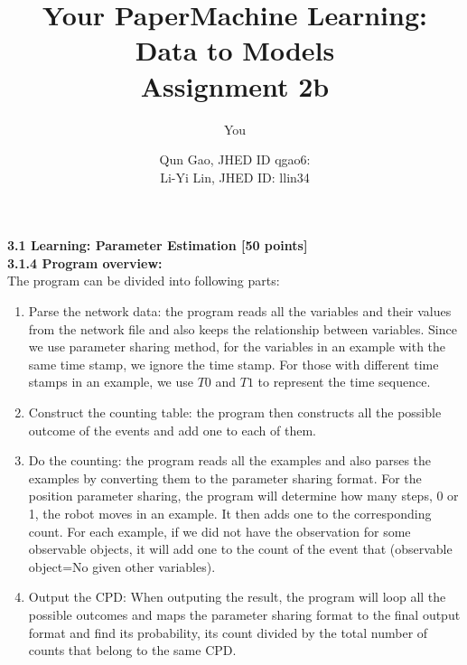 \documentclass[a4paper]{article}
\title{Your Paper}
\author{You}
\title{Machine Learning: Data to Models \\Assignment 2b}
\author{Qun Gao, JHED ID qgao6: \\Li-Yi Lin, JHED ID: llin34}
\date{}
\begin{document}
\maketitle
\noindent \Large \textbf{3.1 Learning: Parameter Estimation [50 points]}\\
\large \textbf{3.1.4 Program overview:}\\
The program can be divided into following parts:\\
\begin{enumerate}[{(1)}]
\item Parse the network data: the program reads all the variables and their values from the network file and also keeps the relationship between variables. Since we use parameter sharing method, for the variables in an example with the same time stamp, we ignore the time stamp. For those with different time stamps in an example, we use $T0$ and $T1$ to represent the time sequence.
\item Construct the counting table: the program then constructs all the possible outcome of the events and add one to each of them.
\item Do the counting: the program reads all the examples and also parses the examples by converting them to the parameter sharing format. For the position parameter sharing, the program will determine how many steps, 0 or 1, the robot moves in an example. It then adds one to the corresponding count. For each example, if we did not have the observation for some observable objects, it will add one to the count of the event that (observable object=No given other variables).
\item Output the CPD: When outputing the result, the program will loop all the possible outcomes and maps the parameter sharing format to the final output format and find its probability, its count divided by the total number of counts that belong to the same CPD.
\end{enumerate}
\end{document}
